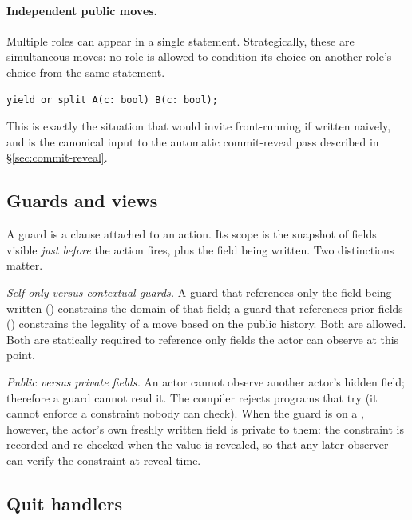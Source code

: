\paragraph{Independent public moves.}  Multiple roles can appear in a
single statement.  Strategically, these are simultaneous moves:
no role is allowed to condition its choice on another role's
choice from the same statement.
\begin{lstlisting}[style=vg]
yield or split A(c: bool) B(c: bool);
\end{lstlisting}
This is exactly the situation that would invite front-running if
written naively, and is the canonical input to the automatic
commit-reveal pass described in \S\ref{sec:commit-reveal}.

\subsection{Guards and views}
\label{sec:lang:guards}

A guard is a  clause attached to an action.  Its scope is
the snapshot of fields visible \emph{just before} the action fires,
plus the field being written.  Two distinctions matter.

\emph{Self-only versus contextual guards.}  A guard that references
only the field being written () constrains the
domain of that field; a guard that references prior fields
() constrains the legality of a move
based on the public history.  Both are allowed.  Both are
statically required to reference only fields the actor can observe
at this point.

\emph{Public versus private fields.}  An actor cannot observe
another actor's hidden field; therefore a guard cannot read it.
The compiler rejects programs that try (it cannot enforce a
constraint nobody can check).  When the guard is on a
, however, the actor's own freshly written field is
private to them: the constraint is recorded and re-checked when
the value is revealed, so that any later observer can verify the
constraint at reveal time.

\subsection{Quit handlers}


